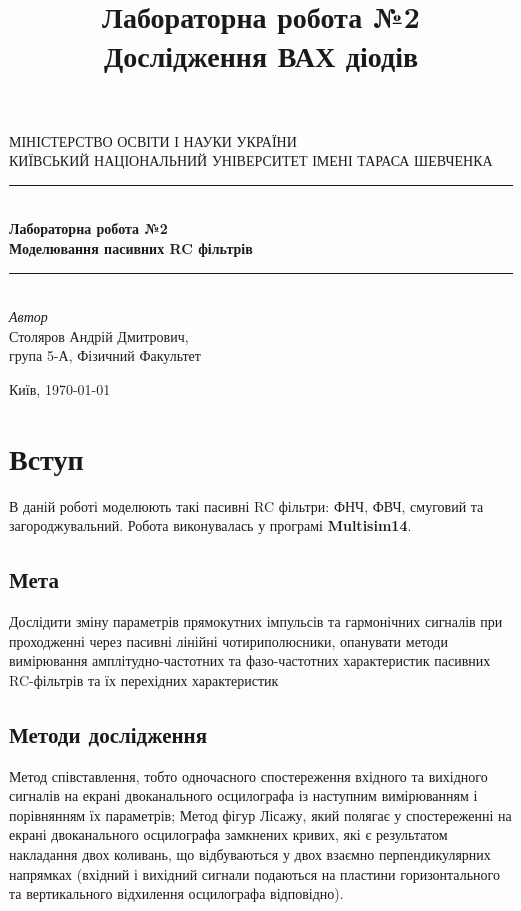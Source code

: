 \documentclass[
  ukrainian,
  14pt
]{extreport}
\author{}
\title{\Huge Лабораторна робота №2 \\\Large Дослідження ВАХ діодів}
\date{}
\begin{document}
\begin{titlepage} 
	\newcommand{\HRule}{\rule{\linewidth}{0.5mm}} 
	
	\center 
	
	\textsc{\Large МІНІСТЕРСТВО ОСВІТИ І НАУКИ УКРАЇНИ\\ \Large КИЇВСЬКИЙ НАЦІОНАЛЬНИЙ УНІВЕРСИТЕТ ІМЕНІ ТАРАСА ШЕВЧЕНКА}\\[1.5cm] 

	
	\HRule\\[0.4cm]
	
	{\huge \bfseries  Лабораторна робота №2 \\\Large \bfseries Моделювання пасивних RC фільтрів
    }\\[0.4cm]
	
	\HRule\\[1.5cm]

	
	

	{\large\textit{Автор}}\\
	\large Столяров Андрій Дмитрович, \\\large група 5-А, Фізичний Факультет 
	
	
	\vfill\vfill\vfill 
	\vfill
	{\normalsize Київ, \today} 
\end{titlepage}
\tableofcontents
\clearpage
\section{Вступ}
В даній роботі моделюють такі пасивні RC
фільтри: ФНЧ, ФВЧ, смуговий та
загороджувальний. Робота виконувалась у програмі \textbf{Multisim14}.
\subsection{Мета}
Дослідити зміну параметрів прямокутних імпульсів та гармонічних сигналів при
проходженні через пасивні лінійні чотириполюсники, опанувати методи вимірювання
амплітудно-частотних та фазо-частотних характеристик пасивних RC-фільтрів та їх перехідних характеристик
\subsection{Методи дослідження}
Метод співставлення, тобто одночасного спостереження вхідного та вихідного сигналів на екрані двоканального осцилографа із наступним вимірюванням і порівнянням
їх параметрів;
Метод фігур Лісажу, який полягає у спостереженні на екрані двоканального
осцилографа замкнених кривих, які є результатом накладання двох коливань, що відбуваються у двох взаємно перпендикулярних напрямках (вхідний і вихідний сигнали
подаються на пластини горизонтального та вертикального відхилення осцилографа відповідно).
\end{document}
